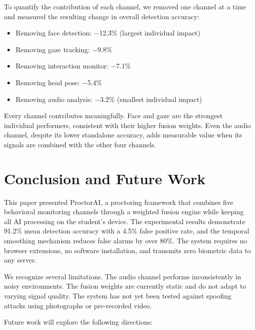 \documentclass[conference]{IEEEtran}
\begin{document}
To quantify the contribution of each channel, we removed one channel at a time and measured the resulting change in overall detection accuracy:

\begin{itemize}
    \item Removing face detection: $-$12.3\% (largest individual impact)
    \item Removing gaze tracking: $-$9.8\%
    \item Removing interaction monitor: $-$7.1\%
    \item Removing head pose: $-$5.4\%
    \item Removing audio analysis: $-$3.2\% (smallest individual impact)
\end{itemize}

Every channel contributes meaningfully. Face and gaze are the strongest individual performers, consistent with their higher fusion weights. Even the audio channel, despite its lower standalone accuracy, adds measurable value when its signals are combined with the other four channels.

\section{Conclusion and Future Work}

This paper presented ProctorAI, a proctoring framework that combines five behavioral monitoring channels through a weighted fusion engine while keeping all AI processing on the student's device. The experimental results demonstrate 91.2\% mean detection accuracy with a 4.5\% false positive rate, and the temporal smoothing mechanism reduces false alarms by over 80\%. The system requires no browser extensions, no software installation, and transmits zero biometric data to any server.

We recognize several limitations. The audio channel performs inconsistently in noisy environments. The fusion weights are currently static and do not adapt to varying signal quality. The system has not yet been tested against spoofing attacks using photographs or pre-recorded video.

Future work will explore the following directions:
\end{document}
